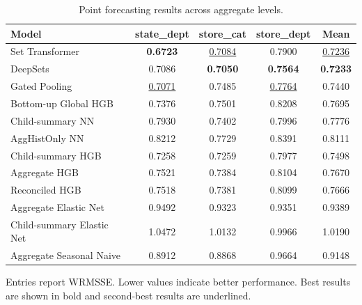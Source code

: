 \begin{table}[H]
\centering
\caption{Point forecasting results across aggregate levels.}
\label{tab:main_point}
\begin{threeparttable}
\begin{tabular}{lcccc}
\toprule
Model & state\_dept & store\_cat & store\_dept & Mean \\
\midrule
Set Transformer & \textbf{0.6723} & \underline{0.7084} & 0.7900 & \underline{0.7236} \\
DeepSets & 0.7086 & \textbf{0.7050} & \textbf{0.7564} & \textbf{0.7233} \\
Gated Pooling & \underline{0.7071} & 0.7485 & \underline{0.7764} & 0.7440 \\
Bottom-up Global HGB & 0.7376 & 0.7501 & 0.8208 & 0.7695 \\
Child-summary NN & 0.7930 & 0.7402 & 0.7996 & 0.7776 \\
AggHistOnly NN & 0.8212 & 0.7729 & 0.8391 & 0.8111 \\
Child-summary HGB & 0.7258 & 0.7259 & 0.7977 & 0.7498 \\
Aggregate HGB & 0.7521 & 0.7384 & 0.8104 & 0.7670 \\
Reconciled HGB & 0.7518 & 0.7381 & 0.8099 & 0.7666 \\
Aggregate Elastic Net & 0.9492 & 0.9323 & 0.9351 & 0.9389 \\
Child-summary Elastic Net & 1.0472 & 1.0132 & 0.9966 & 1.0190 \\
Aggregate Seasonal Naive & 0.8912 & 0.8868 & 0.9664 & 0.9148 \\
\bottomrule
\end{tabular}
\begin{tablenotes}
\footnotesize \item Entries report WRMSSE. Lower values indicate better performance. Best results are shown in bold and second-best results are underlined.
\end{tablenotes}
\end{threeparttable}
\end{table}

